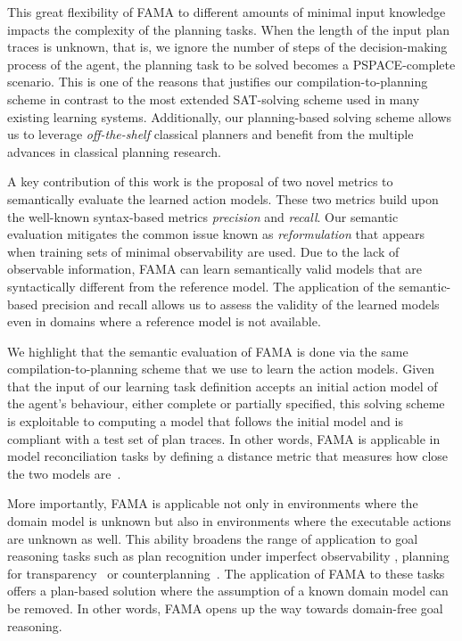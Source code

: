 \documentclass[3p,times]{elsarticle}
\newcommand{\FAMA}{{\small {\sffamily FAMA}}\xspace}
\begin{document}
This great flexibility of \FAMA to different amounts of minimal input knowledge impacts the complexity of the planning tasks. When the length of the input plan traces is unknown, that is, we ignore the number of steps of the decision-making process of the agent, the planning task to be solved becomes a PSPACE-complete scenario. This is one of the reasons that justifies our compilation-to-planning scheme in contrast to the most extended SAT-solving scheme used in many existing learning systems. Additionally, our planning-based solving scheme allows us to leverage {\em off-the-shelf} classical planners and benefit from the multiple advances in classical planning research.

A key contribution of this work is the proposal of two novel metrics to semantically evaluate the learned action models. These two metrics build upon the well-known syntax-based metrics \emph{precision} and \emph{recall}. Our semantic evaluation mitigates the common issue known as \emph{reformulation} that appears when training sets of minimal observability are used. Due to the lack of observable information, \FAMA can learn semantically valid models that are syntactically different from the reference model. The application of the semantic-based precision and recall allows us to assess the validity of the learned models even in domains where a reference model is not available.

We highlight that the semantic evaluation of \FAMA is done via the same compilation-to-planning scheme that we use to learn the action models. Given that the input of our learning task definition accepts an initial action model of the agent's behaviour, either complete or partially specified, this solving scheme is exploitable to computing a model that follows the initial model and is compliant with a test set of plan traces. In other words, \FAMA is applicable in model reconciliation tasks by defining a distance metric that measures how close the two models are~\cite{KulkarniCZVZK16}.

More importantly, \FAMA is applicable not only in environments where the domain model is unknown but also in environments where the executable actions are unknown as well. This ability  broadens the range of application to goal reasoning tasks such as plan recognition under imperfect observability \cite{SohrabiRU16}, planning for transparency~\cite{MacNallyLRP18} or counterplanning~\cite{PozancoEFB18}. The application of \FAMA to these tasks offers a plan-based solution where the assumption of a known domain model can be removed. In other words, \FAMA opens up the way towards domain-free goal reasoning.
\end{document}
